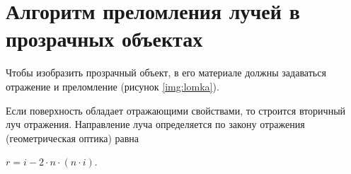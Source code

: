 \begin{figure}[ht!]
\end{figure}

\newpage

\section{Алгоритм преломления лучей в прозрачных объектах}

Чтобы изобразить прозрачный объект, в его материале должны задаваться отражение и преломление (рисунок \ref{img:lomka}). 

Если поверхность обладает отражающими свойствами, то строится вторичный луч отражения. Направление луча определяется по закону отражения (геометрическая оптика) равна 

$r = i - 2 \cdot n \cdot (n \cdot i)$.

